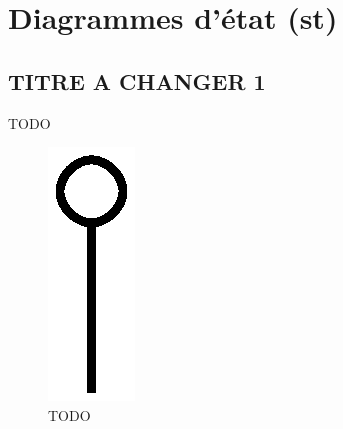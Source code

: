 \chapter{Diagrammes d'état (st)}
\section{TITRE A CHANGER 1}
TODO
\begin{figure}[H]
	\centering
	\includegraphics[width=1\linewidth]{diagrams/bathroom/diagramme_etat_st.eps}
	\caption{TODO}
	\label{fig:diagramme_st}
\end{figure}

